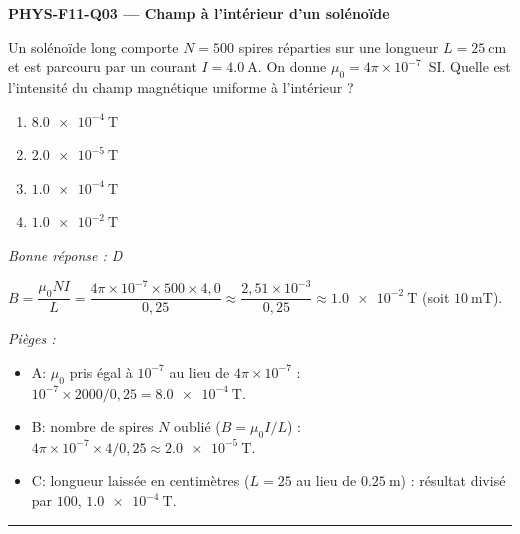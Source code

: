 \documentclass[11pt,a4paper]{article}
\newcommand{\vv}[1]{\vec{#1}}\newcommand{\ds}{\displaystyle}
\begin{document}
\noindent\textbf{PHYS-F11-Q03 --- Champ à l'intérieur d'un solénoïde}\par
Un solénoïde long comporte $N=500$ spires réparties sur une longueur $L=\qty{25}{\centi\metre}$ et est parcouru par un courant $I=\qty{4.0}{\ampere}$. On donne $\mu_0=4\pi\times10^{-7}$~SI. Quelle est l'intensité du champ magnétique uniforme à l'intérieur ?
\begin{center}
\end{center}
\begin{enumerate}[label=\Alph*)]
\item $\qty{8.0e-4}{\tesla}$
\item $\qty{2.0e-5}{\tesla}$
\item $\qty{1.0e-4}{\tesla}$
\item $\qty{1.0e-2}{\tesla}$
\end{enumerate}
\textit{Bonne réponse : D}\par
$B=\dfrac{\mu_0 N I}{L}=\dfrac{4\pi\times10^{-7}\times 500\times 4{,}0}{0{,}25}\approx\dfrac{2{,}51\times10^{-3}}{0{,}25}\approx\qty{1.0e-2}{\tesla}$ (soit $\qty{10}{\milli\tesla}$).\par
\textit{Pièges :}
\begin{itemize}
\item A: $\mu_0$ pris égal à $10^{-7}$ au lieu de $4\pi\times10^{-7}$ : $10^{-7}\times2000/0{,}25=\qty{8.0e-4}{\tesla}$.
\item B: nombre de spires $N$ oublié ($B=\mu_0 I/L$) : $4\pi\times10^{-7}\times4/0{,}25\approx\qty{2.0e-5}{\tesla}$.
\item C: longueur laissée en centimètres ($L=25$ au lieu de $\qty{0.25}{\metre}$) : résultat divisé par $100$, $\qty{1.0e-4}{\tesla}$.
\end{itemize}
\vspace{8pt}\hrule\vspace{8pt}
\end{document}
